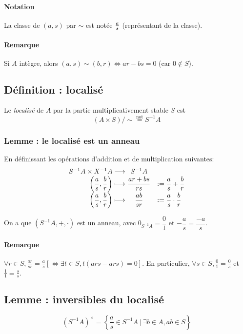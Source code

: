 \documentclass[reqno,a4paper,10pt]{report}
\newcommand{\set}[1]{\left\lbrace #1 \right\rbrace} %
\newcommand{\Such}{\ \Big| \ }
\newcommand{\tnot}[1]{\overset{\text{not}}{ #1 }}
\begin{document}
\paragraph{Notation}
La classe de $(a,s)$ par $\sim$ est notée $a\over s$ (représentant de
la classe).

\paragraph{Remarque}
Si $A$ intègre, alors $(a,s)\sim(b,r) \iff ar-bs=0$ (car $0\not \in S$).

\subsection{Définition : localisé}
Le \emph{localisé} de $A$ par la partie multiplicativement stable $S$ est
\[(A\times S) /\sim \tnot{=} S^{-1} A\]

\subsubsection{Lemme : le localisé est un anneau}
En définissant les opérations d'addition et de multiplication suivantes:
\[
\begin{array}[t]{r@{\ }cl}
  S^{-1}A \times X^{-1}A \longrightarrow& S^{-1}A&\\
  \left(\dfrac{a}{s}, \dfrac{b}{r}\right) \longmapsto& \dfrac{ar+bs}{rs}
  &:= \dfrac{a}{s} + \dfrac{b}{r}\\
  \left(\dfrac{a}{s}, \dfrac{b}{r}\right) \longmapsto& \dfrac{ab}{sr}
  &:= \dfrac{a}{s} \cdot \dfrac{b}{r}
\end{array}
\]

On a que $\left( S^{-1}A, +, \cdot \right)$ est un anneau, avec
$0_{S^{-1}A}=\dfrac{0}{1}$ et $-\dfrac{a}{s}=\dfrac{-a}{s}$.

\begin{comment}
  Preuve 12/11/09 p3
\end{comment}

\paragraph{Remarque}
$\forall r \in S, \frac{ar}{sr}=\frac{a}{s} \left[ \iff \exists
t\in S, t(ars-ars)=0 \right]$. En particulier, $\forall s \in S,
\frac{0}{1}=\frac{0}{s}$ et $\frac{1}{1}=\frac{s}{s}$.

\subsection{Lemme : inversibles du localisé}
\[\left( S^{-1}A \right)^\times = \set{\frac{a}{s}\in S^{-1}A \Such \exists b
\in A, ab \in S}\]
\begin{comment}
  Preuve 18/11/09 p1 (verso)
\end{comment}
\end{document}
